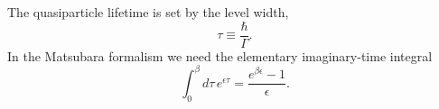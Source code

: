 \documentclass{article}
\begin{document}
The quasiparticle lifetime is set by the level width,
\begin{equation}
\tau \equiv \frac{\hbar}{\Gamma} .
\label{eq:life}
\end{equation}
In the Matsubara formalism we need the elementary imaginary-time integral
\begin{equation}
\int_0^{\beta} d\tau\, e^{\epsilon\tau} = \frac{e^{\beta\epsilon}-1}{\epsilon} .
\label{eq:tau}
\end{equation}
\end{document}
